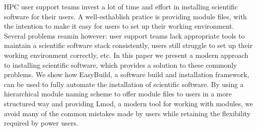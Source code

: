
HPC user support teams invest a lot of time and effort in installing scientific
software for their users. A well-esthablish pratice is providing module files,
with the intention to make it easy for users to set up their working environment.
Several problems reamin however: user support teams lack appropriate tools to maintain a
scientific software stack consistently, users still struggle to set up their working
environment correctly, etc.
In this paper we present a modern approach to installing scientific software, which provides
a solution to these commonly problems. We show how EasyBuild, a software build and
installation framework, can be used to fully automate the installation of scientific software.
By using a hierarchical module naming scheme to offer module files to users in a more structured
way and providing Lmod, a modern tool for working with modules, we avoid many of the common
mistakes made by users while retaining the flexibility required by power users. 
